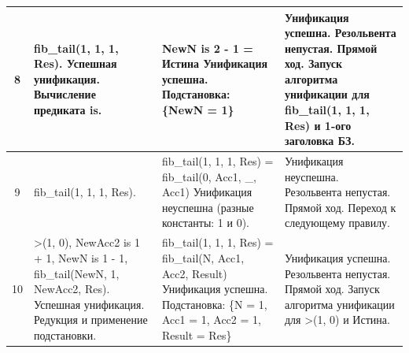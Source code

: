 \begin{tabularx}{\textwidth}{|c|>{\small}X|>{\small}X|>{\small}X|}
	8                                                                                  &
	fib\_tail(1, 1, 1, Res). \newline
	Успешная унификация. \newline
	Вычисление предиката is.                                                           &
	NewN is 2 - 1 = \newline
	Истина \newline
	Унификация успешна. \newline
	Подстановка: \newline
	\{NewN = 1\}                                                                       &
	Унификация успешна. \newline
	Резольвента непустая. \newline
	Прямой ход. \newline
	Запуск алгоритма унификации для fib\_tail(1, 1, 1, Res) и 1-ого заголовка БЗ.        \\
	\hline

	9                                                                                  &
	fib\_tail(1, 1, 1, Res).                                                           &
	fib\_tail(1, 1, 1, Res) = \newline
	fib\_tail(0, Acc1, \_, Acc1) \newline
	Унификация неуспешна (разные константы: 1 и 0).                                    &
	Унификация неуспешна. \newline
	Резольвента непустая. \newline
	Прямой ход. Переход к следующему правилу.                                            \\
	\hline

	10                                                                                 &
	>(1, 0), \newline
	NewAcc2 is 1 + 1, \newline
	NewN is 1 - 1, \newline
	fib\_tail(NewN, 1, NewAcc2, Res). \newline
	Успешная унификация. \newline
	Редукция и применение подстановки.                                                 &
	fib\_tail(1, 1, 1, Res) = \newline
	fib\_tail(N, Acc1, Acc2, Result) \newline
	Унификация успешна. \newline
	Подстановка: \newline
	\{N = 1, Acc1 = 1, Acc2 = 1, Result = Res\}                                        &
	Унификация успешна. \newline
	Резольвента непустая. \newline
	Прямой ход. \newline
	Запуск алгоритма унификации для >(1, 0) и Истина.                                    \\
	\hline


\end{tabularx}
